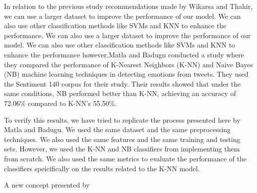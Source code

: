 \documentclass[12pt]{article}
\begin{document}
    \par In relation to the previous study recommendations made by Wikarsa and Thahir, we can use a larger dataset to improve the performance of our model. We can also use other classification methods like SVMs and KNN to enhance the performance. We can also use a larger dataset to improve the performance of our model. We can also use other classification methods like SVMs and KNN to enhance the performance however,Matla and Badugu conducted a study where they compared the performance of K-Nearest Neighbors (K-NN) and Naive Bayes (NB) machine learning techniques in detecting emotions from tweets. They used the Sentiment 140 corpus for their study. Their results showed that under the same conditions, NB performed better than K-NN, achieving an accuracy of 72.06\% compared to K-NN’s 55.50\%. \cite{suhasini2020emotion}
    \par To verify this results, we have tried to replicate the process presented here by Matla and Badugu. We used the same dataset and the same preprocessing techniques. We also used the same features and the same training and testing sets. However, we used the K-NN and NB classifiers from implementing them from scratch. We also used the same metrics to evaluate the performance of the classifiers speicifically on the results related to the K-NN model.
    
    \par A new concept presented by 
    \medskip
    \printbibliography[title={References}]
\end{document}
